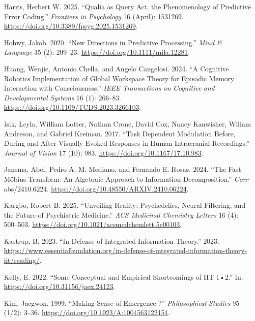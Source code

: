 \documentclass[
  a4paper]{article}
\newlength{\cslhangindent}
\newenvironment{CSLReferences}[2] %
 {\begin{list}{}{%
  \setlength{\itemindent}{0pt}
  \setlength{\leftmargin}{0pt}
  \setlength{\parsep}{0pt}
  \ifodd #1
   \setlength{\leftmargin}{\cslhangindent}
   \setlength{\itemindent}{-1\cslhangindent}
  \fi
  \setlength{\itemsep}{#2\baselineskip}}}
 {\end{list}}
\begin{document}
\begin{CSLReferences}{1}{0}
Harris, Herbert W. 2025. {``Qualia as Query Act, the Phenomenology of
Predictive Error Coding.''} \emph{Frontiers in Psychology} 16 (April):
1531269. \url{https://doi.org/10.3389/fpsyg.2025.1531269}.

Hohwy, Jakob. 2020. {``New Directions in Predictive Processing.''}
\emph{Mind \& Language} 35 (2): 209--23.
\url{https://doi.org/10.1111/mila.12281}.

Huang, Wenjie, Antonio Chella, and Angelo Cangelosi. 2024. {``A
Cognitive Robotics Implementation of Global Workspace Theory for
Episodic Memory Interaction with Consciousness.''} \emph{IEEE
Transactions on Cognitive and Developmental Systems} 16 (1): 266--83.
\url{https://doi.org/10.1109/TCDS.2023.3266103}.

Isik, Leyla, William Lotter, Nathan Crone, David Cox, Nancy Kanwisher,
Wiliam Andreson, and Gabriel Kreiman. 2017. {``Task Dependent Modulation
Before, During and After Visually Evoked Responses in Human Intracranial
Recordings.''} \emph{Journal of Vision} 17 (10): 983.
\url{https://doi.org/10.1167/17.10.983}.

Jansma, Abel, Pedro A. M. Mediano, and Fernando E. Rosas. 2024. {``The
Fast Möbius Transform: An Algebraic Approach to Information
Decomposition.''} \emph{Corr} abs/2410.6224.
\url{https://doi.org/10.48550/ARXIV.2410.06224}.

Kargbo, Robert B. 2025. {``Unveiling Reality: Psychedelics, Neural
Filtering, and the Future of Psychiatric Medicine.''} \emph{ACS
Medicinal Chemistry Letters} 16 (4): 500--503.
\url{https://doi.org/10.1021/acsmedchemlett.5c00103}.

Kastrup, B. 2023. {``In Defense of Integrated Information Theory.''}
2023.
\url{https://www.essentiafoundation.org/in-defense-of-integrated-information-theory-iit/reading/}.

Kelly, E. 2022. {``Some Conceptual and Empirical Shortcomings of {IIT}
1•2.''} In. \url{https://doi.org/10.31156/jaex.24123}.

Kim, Jaegwon. 1999. {``Making Sense of Emergence ?''}
\emph{Philosophical Studies} 95 (1/2): 3--36.
\url{https://doi.org/10.1023/A:1004563122154}.


\end{CSLReferences}
\end{document}
